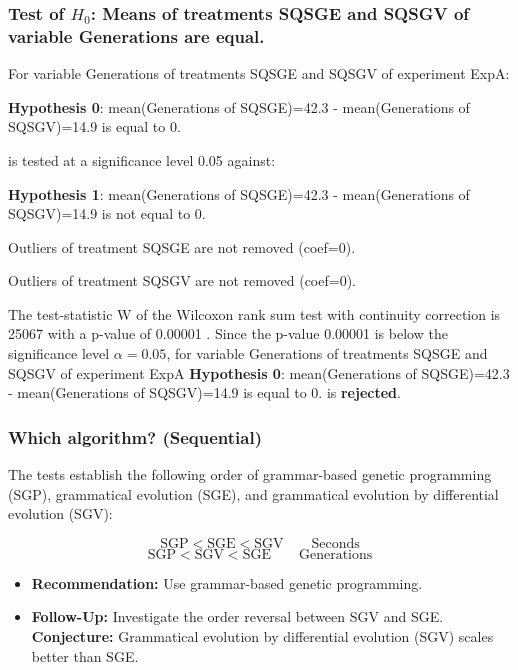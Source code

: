 \documentclass[18pt,c]{beamer}
\makeatletter
\let\beamer@writeslidentry@miniframeson=\beamer@writeslidentry
\newcommand*{\miniframeson}{\let\beamer@writeslidentry=\beamer@writeslidentry@miniframeson}
\makeatother
\begin{document}
\begin{frame}[t]
 \frametitle{Test of $H_{0}$: Means of treatments SQSGE and SQSGV of variable Generations are equal. }
 \scriptsize
 For variable Generations of treatments SQSGE and SQSGV of experiment ExpA:

\vspace{1mm}
{\bf Hypothesis 0}: mean(Generations of SQSGE)=42.3 - mean(Generations of SQSGV)=14.9 is equal to 0.


 \begin{center} is tested at a significance level 0.05 against: \end{center}

{\bf Hypothesis 1}: mean(Generations of SQSGE)=42.3 - mean(Generations of SQSGV)=14.9 is not equal to 0.
\vspace{1mm}
\vspace{1mm}

 Outliers of treatment SQSGE  are not removed (coef=0).

 Outliers of treatment SQSGV  are not removed (coef=0).
\vspace{1mm}
 
 The test-statistic W of the Wilcoxon rank sum test with continuity correction is 25067 with a p-value of 0.00001 .
 Since the p-value 0.00001 is below the significance level $\alpha= 0.05 $,
 for variable Generations of treatments SQSGE and SQSGV of experiment ExpA 
 {\bf Hypothesis 0}: mean(Generations of SQSGE)=42.3 - mean(Generations of SQSGV)=14.9 is equal to 0.
is {\bf rejected}.

 \end{frame}
\begin{frame}
\frametitle{
Which algorithm? (Sequential)
}
The tests establish the following order of grammar-based genetic programming (SGP), 
grammatical evolution (SGE), and grammatical evolution by differential evolution (SGV):
 
\begin{displaymath}
\mbox{SGP} < \mbox{SGE} < \mbox{SGV} \quad\quad \mbox{Seconds}
\end{displaymath}
\begin{displaymath}
\mbox{SGP} < \mbox{SGV} < \mbox{SGE} \quad\quad \mbox{Generations}
\end{displaymath}
 
\begin{itemize}
\item {\bf Recommendation:} Use grammar-based genetic programming.
\item {\bf Follow-Up:} Investigate the order reversal between SGV and SGE.
   {\bf Conjecture:} Grammatical evolution by differential evolution (SGV) scales better than SGE.
\end{itemize}
\end{frame}%
\miniframeson
\end{document}
